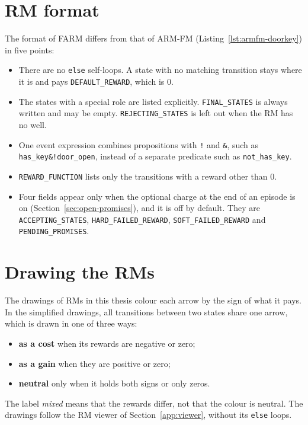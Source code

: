 \documentclass[11pt,english,listoffigures,listoftables]{tfgetsinf}
\begin{document}
\section{RM format}
The format of FARM differs from that of ARM-FM (Listing~\ref{lst:armfm-doorkey}) in five points:
\begin{itemize}
    \item There are no \texttt{else} self-loops. A state with no matching transition stays where it is and pays \texttt{DEFAULT\_REWARD}, which is 0.
    \item The states with a special role are listed explicitly. \texttt{FINAL\_\allowbreak STATES} is always written and may be empty. \texttt{REJECTING\_\allowbreak STATES} is left out when the RM has no well.
    \item One event expression combines propositions with \texttt{!} and \texttt{\&}, such as \texttt{has\_key\&\allowbreak !door\_open}, instead of a separate predicate such as \texttt{not\_has\_key}.
    \item \texttt{REWARD\_FUNCTION} lists only the transitions with a reward other than 0.
    \item Four fields appear only when the optional charge at the end of an episode is on (Section~\ref{sec:open-promises}), and it is off by default. They are \texttt{ACCEPTING\_\allowbreak STATES}, \texttt{HARD\_\allowbreak FAILED\_\allowbreak REWARD}, \texttt{SOFT\_\allowbreak FAILED\_\allowbreak REWARD} and \texttt{PENDING\_\allowbreak PROMISES}.
\end{itemize}

\section{Drawing the RMs}
\label{app:drawing}
The drawings of RMs in this thesis colour each arrow by the sign of what it pays. In the simplified drawings, all transitions between two states share one arrow, which is drawn in one of three ways:
\begin{itemize}
    \item \textbf{as a cost} when its rewards are negative or zero;
    \item \textbf{as a gain} when they are positive or zero;
    \item \textbf{neutral} only when it holds both signs or only zeros.
\end{itemize}
The label \textit{mixed} means that the rewards differ, not that the colour is neutral. The drawings follow the RM viewer of Section~\ref{app:viewer}, without its \texttt{else} loops.
\end{document}
